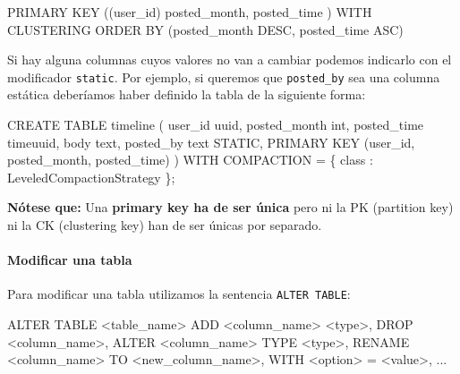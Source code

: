 \documentclass[
]{book}
\newenvironment{Shaded}{}{}
\newcommand{\NormalTok}[1]{#1}
\begin{document}
\begin{Shaded}
\begin{Highlighting}[]
\NormalTok{PRIMARY KEY ((user\_id) posted\_month, posted\_time ) WITH CLUSTERING ORDER BY (posted\_month DESC, posted\_time ASC)}
\end{Highlighting}
\end{Shaded}

Si hay alguna columnas cuyos valores no van a cambiar podemos indicarlo con el modificador \texttt{static}. Por ejemplo, si queremos que \texttt{posted\_by} sea una columna estática deberíamos haber definido la tabla de la siguiente forma:

\begin{Shaded}
\begin{Highlighting}[]
\NormalTok{CREATE TABLE timeline (}
\NormalTok{    user\_id uuid,}
\NormalTok{    posted\_month int,}
\NormalTok{    posted\_time timeuuid,}
\NormalTok{    body text,}
\NormalTok{    posted\_by text STATIC,}
\NormalTok{    PRIMARY KEY (user\_id, posted\_month, posted\_time)}
\NormalTok{) WITH COMPACTION = \{ \textquotesingle{}class\textquotesingle{} : \textquotesingle{}LeveledCompactionStrategy\textquotesingle{} \};}
\end{Highlighting}
\end{Shaded}

\textbf{Nótese que:} Una \textbf{primary key ha de ser única} pero ni la PK (partition key) ni la CK (clustering key) han de ser únicas por separado.

\paragraph{Modificar una tabla}\label{modificar-una-tabla}

Para modificar una tabla utilizamos la sentencia \texttt{ALTER\ TABLE}:

\begin{Shaded}
\begin{Highlighting}[]
\NormalTok{ALTER TABLE \textless{}table\_name\textgreater{}}
\NormalTok{  ADD \textless{}column\_name\textgreater{} \textless{}type\textgreater{},}
\NormalTok{  DROP \textless{}column\_name\textgreater{},}
\NormalTok{  ALTER \textless{}column\_name\textgreater{} TYPE \textless{}type\textgreater{},}
\NormalTok{  RENAME \textless{}column\_name\textgreater{} TO \textless{}new\_column\_name\textgreater{},}
\NormalTok{  WITH \textless{}option\textgreater{} = \textless{}value\textgreater{},}
\NormalTok{  ...}
\end{Highlighting}
\end{Shaded}
\end{document}

